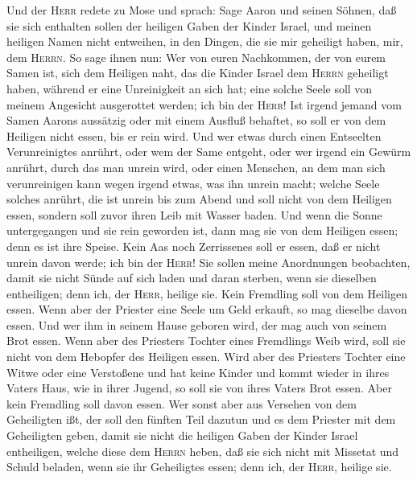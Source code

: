  Und der \textsc{Herr} redete zu Mose und sprach: Sage
Aaron und seinen Söhnen,  daß sie sich enthalten sollen
der heiligen Gaben der Kinder Israel, und meinen heiligen Namen nicht
entweihen, in den Dingen, die sie mir geheiligt haben, mir, dem
\textsc{Herrn}.  So sage ihnen nun: Wer von euren
Nachkommen, der von eurem Samen ist, sich dem Heiligen naht, das die
Kinder Israel dem \textsc{Herrn} geheiligt haben, während er eine
Unreinigkeit an sich hat; eine solche Seele soll von meinem Angesicht
ausgerottet werden; ich bin der \textsc{Herr}!  Ist irgend
jemand vom Samen Aarons aussätzig oder mit einem Ausfluß behaftet, so
soll er von dem Heiligen nicht essen, bis er rein wird. Und wer etwas
durch einen Entseelten Verunreinigtes anrührt, oder wem der Same
entgeht,  oder wer irgend ein Gewürm anrührt, durch das
man unrein wird, oder einen Menschen, an dem man sich verunreinigen kann
wegen irgend etwas, was ihn unrein macht;  welche Seele
solches anrührt, die ist unrein bis zum Abend und soll nicht von dem
Heiligen essen, sondern soll zuvor ihren Leib mit Wasser baden.
 Und wenn die Sonne untergegangen und sie rein geworden
ist, dann mag sie von dem Heiligen essen; denn es ist ihre Speise.
 Kein Aas noch Zerrissenes soll er essen, daß er nicht
unrein davon werde; ich bin der \textsc{Herr}!  Sie sollen
meine Anordnungen beobachten, damit sie nicht Sünde auf sich laden und
daran sterben, wenn sie dieselben entheiligen; denn ich, der
\textsc{Herr}, heilige sie.  Kein Fremdling soll von dem
Heiligen essen.  Wenn aber der Priester eine Seele um
Geld erkauft, so mag dieselbe davon essen. Und wer ihm in seinem Hause
geboren wird, der mag auch von seinem Brot essen.  Wenn
aber des Priesters Tochter eines Fremdlings Weib wird, soll sie nicht
von dem Hebopfer des Heiligen essen.  Wird aber des
Priesters Tochter eine Witwe oder eine Verstoßene und hat keine Kinder
und kommt wieder in ihres Vaters Haus, wie in ihrer Jugend, so soll sie
von ihres Vaters Brot essen. Aber kein Fremdling soll davon essen.
 Wer sonst aber aus Versehen von dem Geheiligten ißt, der
soll den fünften Teil dazutun und es dem Priester mit dem Geheiligten
geben,  damit sie nicht die heiligen Gaben der Kinder
Israel entheiligen, welche diese dem \textsc{Herrn} heben,
 daß sie sich nicht mit Missetat und Schuld beladen, wenn
sie ihr Geheiligtes essen; denn ich, der \textsc{Herr}, heilige sie.
